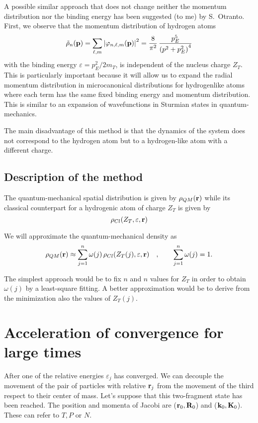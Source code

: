  A possible similar approach that does not change neither the momentum
distribution nor the binding energy has been suggested (to me) by S.~Otranto. First, we observe
that the momentum distribution of hydrogen atoms
\begin{equation}\label{Q:class-momen-distr-hydro}
  \tilde{\rho}_{n}(\mathbf{p}) = \sum_{\ell, m} \left| \varphi_{n,\ell,m}(\mathbf{p})\right|^{2} 
  = \frac{8 }{\pi^{2}} \, \frac{p_{E}^{5}}{\left( p^{2} + p_{E}^{2} \right)^{4}}
\end{equation}
with the binding energy $\varepsilon=p_{E}^{2}/2 m_{T}$, is independent of the
nucleus charge $Z_{T}$. This is particularly important because it will allow us
to expand the radial momentum distribution in microcanonical distributions for
hydrogenlike atoms where each term has the same fixed binding energy and
momentum distribution. This is similar to an expansion of wavefunctions in
Sturmian states in quantum-mechanics.

The main disadvantage of this method is that the dynamics of the system does not
correspond to the hydrogen atom but to a hydrogen-like atom with a different
charge.

\subsection{Description of the method}
\label{S:description-method}

The quantum-mechanical spatial distribution is given by $\rho_{QM}(\mathbf{r})$
while its classical counterpart for a hydrogenic atom of charge $Z_{T}$ is given by
\begin{equation}\label{Q:class-spati-distr-hydro}
  \rho_{Cl}(Z_{T}, \varepsilon, \mathbf{r})
\end{equation}

We will approximate the quantum-mechanical density as
\begin{equation}\label{Q:fitti-densi}
  \rho_{QM}(\mathbf{r}) \approx \sum_{j=1}^{n} \omega(j) \, \rho_{Cl}(Z_{T}(j), \varepsilon, \mathbf{r}) \quad, \qquad
  \sum_{j=1}^{n} \omega(j) = 1.
\end{equation}

The simplest approach would be to fix $n$ and $n$ values for $Z_{T}$ in order to
obtain $\omega(j)$ by a least-square fitting. A better approximation would be to
derive from the minimization also the values of $Z_{T}(j)$.

\section{Acceleration of convergence for large times}
After one of the relative energies $\varepsilon_{j}$ has converged. We
can decouple the movement of the pair of particles with relative
$\mathbf{r}_{j}$ from the movement of the third respect to their center of
mass. Let's suppose that this two-fragment state has been reached. The
position and momenta of Jacobi are ($\mathbf{r}_{0},\mathbf{R}_{0}$) and
($\mathbf{k}_{0},\mathbf{K}_{0}$). These can refer to $T,P$ or $N$.

